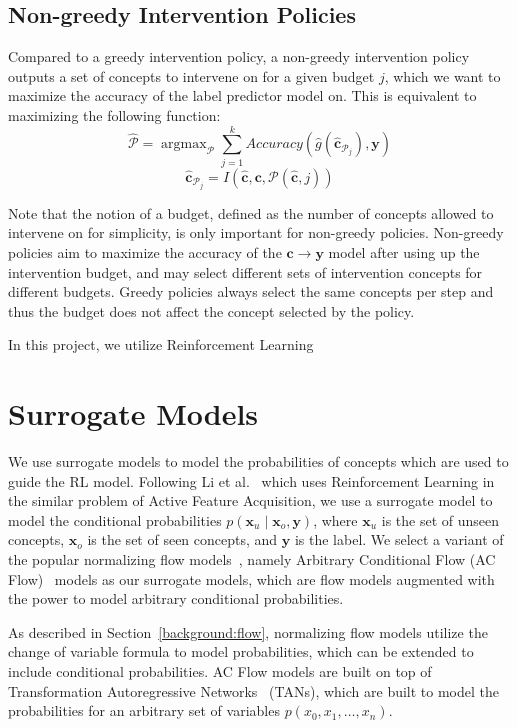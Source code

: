 \documentclass[../main.tex]{subfiles}
\begin{document}
\subsection{Non-greedy Intervention Policies}

Compared to a greedy intervention policy, a non-greedy intervention 
policy outputs a set of concepts to intervene on for a given budget $j$,
which we want to maximize the accuracy of the 
label predictor model on. This is equivalent to maximizing the following 
function:
\[\hat{\mathcal{P}} = \mathop{\mathrm{argmax}}_{\mathcal{P}} \sum_{j=1}^k Accuracy(\hat{g}(\hat{\mathbf{c}}_{\mathcal{P}_j}), \mathbf{y}) \]
\[\hat{\mathbf{c}}_{\mathcal{P}_j} = I(\hat{\mathbf{c}}, \mathbf{c}, \mathcal{P}(\hat{\mathbf{c}}, j))\]

Note that the notion of a budget, defined as the number
of concepts allowed to intervene on for simplicity, is only
important for non-greedy policies. Non-greedy policies aim
to maximize the accuracy of the $\mathbf{c} \to \mathbf{y}$ model after using up the intervention budget,
and may select different sets of intervention concepts 
for different budgets. Greedy policies always select the same
concepts per step and thus the budget does not 
affect the concept selected by the policy.

In this project, we utilize Reinforcement Learning

\section{Surrogate Models}\label{method:surrogate}

We use surrogate models to model the probabilities of concepts which are used
to guide the RL model. Following Li et al.~\cite{afa} which uses Reinforcement Learning
in the similar problem of Active Feature Acquisition, we use a surrogate model to model
the conditional probabilities $p(\mathbf{x}_u \mid \mathbf{x}_o, \mathbf{y})$, 
where $\mathbf{x}_u$ is the set of unseen concepts, $\mathbf{x}_o$ is the set of seen concepts,
and $\mathbf{y}$ is the label. We select a variant of the popular normalizing flow models~\cite{normalizing-flows},
namely Arbitrary Conditional Flow (AC Flow)~\cite{acflow}
models as our surrogate models, 
which are flow models augmented with the power to model arbitrary conditional probabilities.

As described in Section~\ref{background:flow}, 
normalizing flow models utilize the change of variable formula to model probabilities,
which can be extended to include conditional probabilities. AC Flow models are built on top of
Transformation Autoregressive
Networks~\cite{tans} (TANs), which are built to model 
the probabilities for an arbitrary set of variables $p(x_0, x_1, \ldots, x_n)$.
\end{document}
